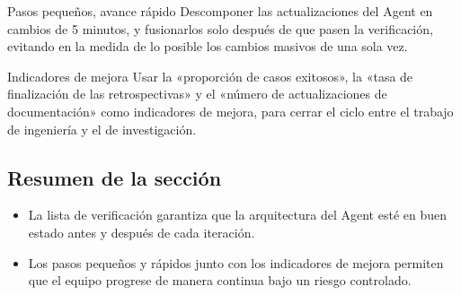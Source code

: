 \begin{importantbox}{Pasos pequeños, avance rápido}
Descomponer las actualizaciones del Agent en cambios de 5 minutos, y fusionarlos solo después de que pasen la verificación, evitando en la medida de lo posible los cambios masivos de una sola vez.
\end{importantbox}

\begin{knowledgebox}{Indicadores de mejora}
Usar la «proporción de casos exitosos», la «tasa de finalización de las retrospectivas» y el «número de actualizaciones de documentación» como indicadores de mejora, para cerrar el ciclo entre el trabajo de ingeniería y el de investigación.
\end{knowledgebox}

\subsection{Resumen de la sección}
\begin{itemize}
    \item La lista de verificación garantiza que la arquitectura del Agent esté en buen estado antes y después de cada iteración.
    \item Los pasos pequeños y rápidos junto con los indicadores de mejora permiten que el equipo progrese de manera continua bajo un riesgo controlado.
\end{itemize}

